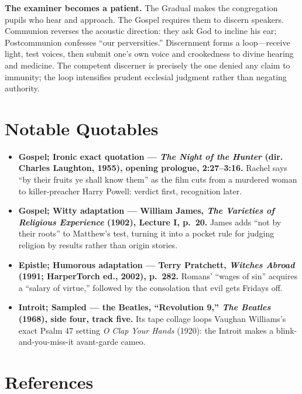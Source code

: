 \begin{deepstudy}
\noindent\textbf{The examiner becomes a patient.\enspace{}}
The Gradual makes the congregation pupils who hear and approach. The Gospel requires them to discern speakers. Communion reverses the acoustic direction: they ask God to incline his ear; Postcommunion confesses ``our perversities.'' Discernment forms a loop---receive light, test voices, then submit one's own voice and crookedness to divine hearing and medicine. The competent discerner is precisely the one denied any claim to immunity; the loop intensifies prudent ecclesial judgment rather than negating authority.

\sectionguard
\section*{Notable Quotables}

{\small
\begin{itemize}[leftmargin=1.25em,itemsep=0.4em,topsep=0.15em,parsep=0pt]
\item \textbf{Gospel; Ironic exact quotation --- \emph{The Night of the Hunter} (dir. Charles Laughton, 1955), opening prologue, 2:27--3:16.} Rachel says ``by their fruits ye shall know them'' as the film cuts from a murdered woman to killer-preacher Harry Powell: verdict first, recognition later.

\item \textbf{Gospel; Witty adaptation --- William James, \emph{The Varieties of Religious Experience} (1902), Lecture I, p.~20.} James adds ``not by their roots'' to Matthew's test, turning it into a pocket rule for judging religion by results rather than origin stories.

\item \textbf{Epistle; Humorous adaptation --- Terry Pratchett, \emph{Witches Abroad} (1991; HarperTorch ed., 2002), p.~282.} Romans' ``wages of sin'' acquires a ``salary of virtue,'' followed by the consolation that evil gets Fridays off.

\item \textbf{Introit; Sampled --- the Beatles, ``Revolution 9,'' \emph{The Beatles} (1968), side four, track five.} Its tape collage loops Vaughan Williams's exact Psalm 47 setting \emph{O Clap Your Hands} (1920): the Introit makes a blink-and-you-miss-it avant-garde cameo.
\end{itemize}
}

\section*{References}


\end{deepstudy}
